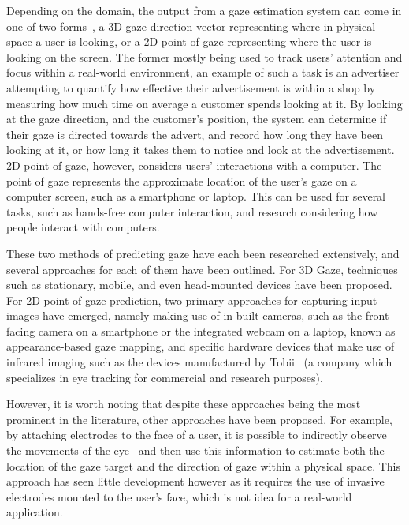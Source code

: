 \documentclass{report}
\begin{document}
Depending on the domain, the output from a gaze estimation system can come in one of two forms~\cite{liu2022in}, a 3D gaze direction vector representing where in physical space a user is looking, or a 2D point-of-gaze representing where the user is looking on the screen. The former mostly being used to track users' attention and focus within a real-world environment, an example of such a task is an advertiser attempting to quantify how effective their advertisement is within a shop by measuring how much time on average a customer spends looking at it. By looking at the gaze direction, and the customer's position, the system can determine if their gaze is directed towards the advert, and record how long they have been looking at it, or how long it takes them to notice and look at the advertisement. 2D point of gaze, however, considers users' interactions with a computer. The point of gaze represents the approximate location of the user's gaze on a computer screen, such as a smartphone or laptop. This can be used for several tasks, such as hands-free computer interaction, and research considering how people interact with computers. 

These two methods of predicting gaze have each been researched extensively, and several approaches for each of them have been outlined. For 3D Gaze, techniques such as stationary, mobile, and even head-mounted devices have been proposed. For 2D point-of-gaze prediction, two primary approaches for capturing input images have emerged, namely making use of in-built cameras, such as the front-facing camera on a smartphone or the integrated webcam on a laptop, known as appearance-based gaze mapping, and specific hardware devices that make use of infrared imaging such as the devices manufactured by Tobii~\cite{tobiiprofusion} (a company which specializes in eye tracking for commercial and research purposes). 

However, it is worth noting that despite these approaches being the most prominent in the literature, other approaches have been proposed. For example, by attaching electrodes to the face of a user, it is possible to indirectly observe the movements of the eye~\cite{young1975survey} and then use this information to estimate both the location of the gaze target and the direction of gaze within a physical space. This approach has seen little development however as it requires the use of invasive electrodes mounted to the user's face, which is not idea for a real-world application. 
\end{document}
